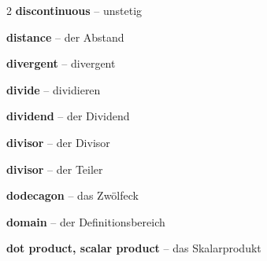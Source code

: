 \begin{multicols}{2}
\textbf{discontinuous} -- unstetig\dotfill\hyperref[e:269]{\pageref*{e:269}}\par
\textbf{distance} -- der Abstand\dotfill\hyperref[e:152]{\pageref*{e:152}}\par
\textbf{divergent} -- divergent\dotfill\hyperref[e:263]{\pageref*{e:263}}\par
\textbf{divide} -- dividieren\dotfill\hyperref[e:24]{\pageref*{e:24}}\par
\textbf{dividend} -- der Dividend\dotfill\hyperref[e:26]{\pageref*{e:26}}\par
\textbf{divisor} -- der Divisor\dotfill\hyperref[e:27]{\pageref*{e:27}}\par
\textbf{divisor} -- der Teiler\dotfill\hyperref[e:54]{\pageref*{e:54}}\par
\textbf{dodecagon} -- das Zwölfeck\dotfill\hyperref[e:208]{\pageref*{e:208}}\par
\textbf{domain} -- der Definitionsbereich\dotfill\hyperref[e:109]{\pageref*{e:109}}\par
\textbf{dot product, scalar product} -- das Skalarprodukt\dotfill\hyperref[e:306]{\pageref*{e:306}}\par


\end{multicols}
